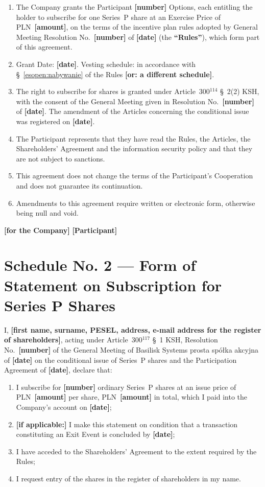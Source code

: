 \documentclass[11pt,a4paper]{report}
\newcommand{\field}[1]{\textbf{[#1]}}
\newcommand{\CompanyFull}{Basilisk Systems prosta spółka akcyjna}
\begin{document}
\begin{enumerate}
  \item The Company grants the Participant \field{number} Options, each entitling the holder to subscribe for one Series~P share at an Exercise Price of PLN~\field{amount}, on the terms of the incentive plan rules adopted by General Meeting Resolution No.~\field{number} of \field{date} (the \textbf{``Rules''}), which form part of this agreement.
  \item Grant Date: \field{date}. Vesting schedule: in accordance with \S~\ref{esopen:nabywanie} of the Rules \field{or: a different schedule}.
  \item The right to subscribe for shares is granted under Article~300$^{114}$ \S~2(2) KSH, with the consent of the General Meeting given in Resolution No.~\field{number} of \field{date}. The amendment of the Articles concerning the conditional issue was registered on \field{date}.
  \item The Participant represents that they have read the Rules, the Articles, the Shareholders' Agreement and the information security policy and that they are not subject to sanctions.
  \item This agreement does not change the terms of the Participant's Cooperation and does not guarantee its continuation.
  \item Amendments to this agreement require written or electronic form, otherwise being null and void.
\end{enumerate}

\vspace{1em}
\field{for the Company} \hfill \field{Participant}

\chapter*{Schedule No. 2 --- Form of Statement on Subscription for Series P Shares}

I, \field{first name, surname, PESEL, address, e-mail address for the register of shareholders}, acting under Article~300$^{117}$ \S~1 KSH, Resolution No.~\field{number} of the General Meeting of \CompanyFull{} of \field{date} on the conditional issue of Series~P shares and the Participation Agreement of \field{date}, declare that:
\begin{enumerate}
  \item I subscribe for \field{number} ordinary Series~P shares at an issue price of PLN~\field{amount} per share, PLN~\field{amount} in total, which I paid into the Company's account on \field{date};
  \item \field{if applicable:} I make this statement on condition that a transaction constituting an Exit Event is concluded by \field{date};
  \item I have acceded to the Shareholders' Agreement to the extent required by the Rules;
  \item I request entry of the shares in the register of shareholders in my name.
\end{enumerate}
\end{document}
